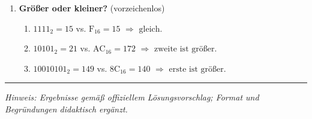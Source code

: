 \documentclass[11pt,a4paper]{scrartcl}
\begin{document}
\begin{enumerate}[leftmargin=*,label=\textbf{Aufgabe~\arabic*:}, itemsep=0.9em, start=1]
		\item \textbf{Größer oder kleiner?} (vorzeichenlos)
		\begin{enumerate}[label*=\alph*)]
			\item \(1111_2=15\) vs. \(\mathrm{F}_{16}=15\) \(\Rightarrow\) \(\boxed{\text{gleich}}\).
			\item \(10101_2=21\) vs. \(\mathrm{AC}_{16}=172\) \(\Rightarrow\) \(\boxed{\text{zweite ist größer}}\).
			\item \(10010101_2=149\) vs. \(\mathrm{8C}_{16}=140\) \(\Rightarrow\) \(\boxed{\text{erste ist größer}}\).
		\end{enumerate}
		
	\end{enumerate}
	
	\vfill
	\hrule
	\small\emph{Hinweis: Ergebnisse gemäß offiziellem Lösungsvorschlag; Format und Begründungen didaktisch ergänzt.}
	
\end{document}
